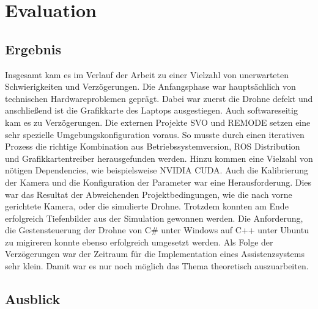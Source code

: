 \chapter{Evaluation}
\section{Ergebnis}
Insgesamt kam es im Verlauf der Arbeit zu einer Vielzahl von unerwarteten Schwierigkeiten und Verzögerungen. Die Anfangsphase war hauptsächlich von technischen Hardwareproblemen geprägt. Dabei war zuerst die Drohne defekt und anschließend ist die Grafikkarte des Laptops ausgestiegen. \newline
Auch softwareseitig kam es zu Verzögerungen. Die externen Projekte SVO und REMODE setzen eine sehr spezielle Umgebungskonfiguration voraus. So musste durch einen iterativen Prozess die richtige Kombination aus Betriebssystemversion, ROS Distribution und Grafikkartentreiber herausgefunden werden. Hinzu kommen eine Vielzahl von nötigen Dependencies, wie beispielsweise NVIDIA CUDA.  \newline
Auch die Kalibrierung der Kamera und die Konfiguration der Parameter war eine Herausforderung. Dies war das Resultat der Abweichenden Projektbedingungen, wie die nach vorne gerichtete Kamera, oder die simulierte Drohne. \newline
Trotzdem konnten am Ende erfolgreich Tiefenbilder aus der Simulation gewonnen werden. Die Anforderung, die Gestensteuerung der Drohne von C# unter Windows auf C++ unter Ubuntu zu migireren konnte ebenso erfolgreich umgesetzt werden. \newline
Als Folge der Verzögerungen war der Zeitraum für die Implementation eines Assistenzsystems sehr klein. Damit war es nur noch möglich das Thema theoretisch auszuarbeiten.

\section{Ausblick}
